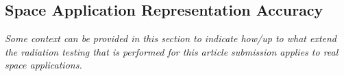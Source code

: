 \subsection{Space Application Representation Accuracy}\label{subsec:discussion_space_application_representation_accuracy}
\textit{Some context can be provided in this section to indicate how/up to what extend the radiation testing that is performed for this article submission applies to real space applications.}